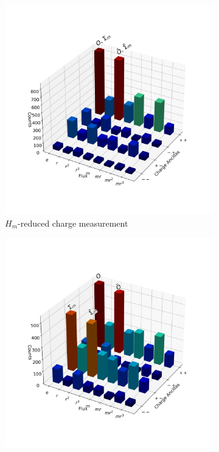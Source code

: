 \documentclass[a4paper,twocolumn,11pt]{quantumarticle}
\begin{document}
\begin{figure}
    \centering
    \begin{subfigure}{0.49\linewidth}
        \centering
        \includegraphics[width=\linewidth]{Figures/basket_m.png}
        \caption{$H_m$-reduced charge measurement}
        \label{fig:basket_Hm}
    \end{subfigure}
    \begin{subfigure}{0.49\linewidth}
        \centering
        \includegraphics[width=\linewidth]{Figures/basket_mr.png}

\end{subfigure}
\end{figure}
\end{document}
